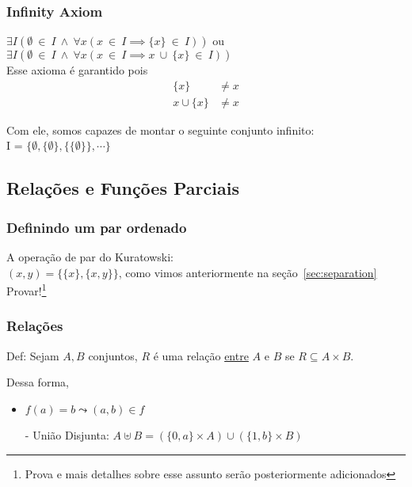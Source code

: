 \documentclass[12pt, a4paper]{article}
\begin{document}
\subsubsection{Infinity Axiom}
\label{sec:infinity}
$\exists I (\emptyset ~\in~ I ~\land~ \forall x (x ~\in~ I \implies \{x\} ~\in~ I ))$ ou\\
$\exists I (\emptyset ~\in~ I ~\land~ \forall x (x ~\in~ I \implies x ~\cup~ \{x\} ~\in~ I ))$\\

Esse axioma é garantido pois\\
\begin{align*}
\{x\} &\ne x \\
x \cup \{x\} &\ne x
\end{align*}

Com ele, somos capazes de montar o seguinte conjunto infinito:\\
I = $\{ \emptyset, \{\emptyset\}, \{\{\emptyset\}\}, \cdots \}$

\subsection{Relações e Funções Parciais}
\subsubsection{Definindo um par ordenado}
A operação de par do Kuratowski:\\
$ (x, y) = \{ \{x\}, \{x, y\}\} $, como vimos anteriormente na seção~\ref{sec:separation}\\

Provar!\footnote{Prova e mais detalhes sobre esse assunto serão posteriormente adicionados}

\subsubsection{Relações}

Def: Sejam $A,B$ conjuntos, $R$ é uma relação \underline{entre} $A$ e $B$ se $R \subseteq A \times B$.

Dessa forma,
\begin{itemize}
\item $f(a) = b \leadsto (a,b) \in f$
\end{itemize}

\begin{itemize}
\item[-] União Disjunta: $A \uplus B = (\{0,a\} \times A) \cup (\{1,b\} \times B)$
\end{itemize}
\end{document}
